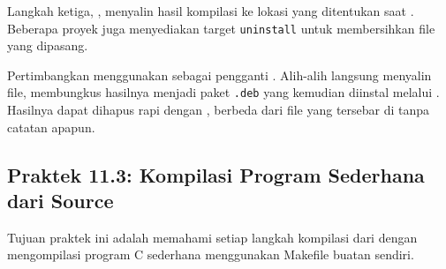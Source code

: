 Langkah ketiga, , menyalin hasil kompilasi ke lokasi
yang ditentukan saat . Beberapa proyek juga menyediakan target
\texttt{uninstall} untuk membersihkan file yang dipasang.

\begin{tipbox}
Pertimbangkan menggunakan  sebagai pengganti .
Alih-alih langsung menyalin file,  membungkus hasilnya menjadi
paket \texttt{.deb} yang kemudian diinstal melalui . Hasilnya dapat
dihapus rapi dengan , berbeda dari file yang tersebar di
 tanpa catatan apapun.
\end{tipbox}

\subsection*{Praktek 11.3: Kompilasi Program Sederhana dari Source}

Tujuan praktek ini adalah memahami setiap langkah kompilasi dari 
dengan mengompilasi program C sederhana menggunakan Makefile buatan sendiri.

